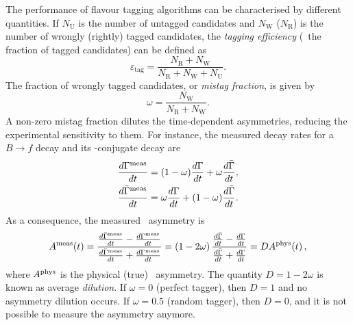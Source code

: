 The performance of flavour tagging algorithms can be characterised by different quantities. If $N_\mathrm{U}$ is the number of untagged
candidates and $N_\mathrm{W}$ ($N_\mathrm{R}$) is the number of wrongly (rightly) tagged candidates, the \emph{tagging efficiency}
(\ie~the fraction of tagged candidates) can be defined as
\begin{equation}
	\varepsilon_\text{tag}=\frac{N_\mathrm{R}+N_\mathrm{W}}{N_\mathrm{R}+N_\mathrm{W}+N_\mathrm{U}}.
	\label{eq:taggingefficiency}
\end{equation}
The fraction of wrongly tagged candidates, or \emph{mistag fraction}, is given by
\begin{equation}
\label{eq:mistag_def}
	\omega=\frac{N_\mathrm{W}}{N_\mathrm{R}+N_\mathrm{W}}.
\end{equation}
A non-zero mistag fraction dilutes the time-dependent asymmetries, reducing the experimental sensitivity to them. For instance, the measured decay rates for a $B\to f$ decay and its \CP-conjugate decay are
\begin{align}
	\frac{d\Gamma^{\rm meas}}{dt} &= (1-\omega)\frac{d\Gamma}{dt} + \omega \frac{d\bar\Gamma}{dt}, \\
	\frac{d\bar\Gamma^{\rm meas}}{dt} &= \omega\frac{d\Gamma}{dt} + (1-\omega) \frac{d\bar\Gamma}{dt}.
\end{align}
As a consequence, the measured \CP~asymmetry is
\begin{equation}
	A^{\rm meas}(t) = \frac{ \frac{d\bar\Gamma^{\rm meas}}{dt} - \frac{d\Gamma^{\rm meas}}{dt} }{ \frac{d\bar\Gamma^{\rm meas}}{dt} + \frac{d\Gamma^{\rm meas}}{dt} } 
	= \left(1-2\omega\right) \frac{ \frac{d\bar\Gamma}{dt} - \frac{d\Gamma}{dt} }{ \frac{d\bar\Gamma}{dt} + \frac{d\Gamma}{dt} } 
	= DA^{\rm phys}(t)\,, 
\end{equation}
where $A^{\rm phys}$ is the physical (true) \CP~asymmetry.
The quantity $D=1-2\omega$ is known as average \emph{dilution}. If $\omega=0$ (perfect tagger), then $D=1$ and no asymmetry dilution occurs. 
If $\omega=0.5$ (random tagger), then $D=0$, and it is not possible to measure the asymmetry anymore.

